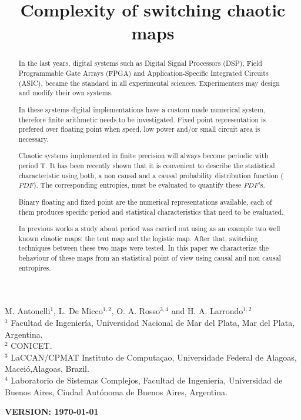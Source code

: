 \begin{frontmatter}

	\title{Complexity of switching chaotic maps}
	M. Antonelli$^{1}$, L. De Micco$^{1,2}$, O. A. Rosso$^{3,4}$ and H. A. Larrondo$^{1,2}$\\
	$^{1}$ Facultad de Ingenier\'ia, Universidad Nacional de Mar del Plata, Mar del Plata, Argentina.\\
	$^{2}$ CONICET.\\
	$^{3}$ LaCCAN/CPMAT Instituto de Computa\c{c}ao, Universidade Federal de Alagoas, Macei\'o,Alagoas, Brazil.\\
	$^{4}$ Laboratorio de Sistemas Complejos, Facultad de
	Ingenier\'ia, Universidad de Buenos Aires, Ciudad Aut\'onoma de
	Buenos Aires, Argentina.\\

\begin{abstract}
In the last years, digital systems such as Digital Signal Processors (DSP), Field Programmable Gate Arrays (FPGA) and Application-Specific Integrated Circuits (ASIC), became the standard in all experimental sciences.
Experimenters may design and modify their own systems.

In these systems digital implementations have a custom made numerical system, therefore finite arithmetic needs to be investigated.
Fixed point representation is prefered over floating point when  speed, low power and/or small circuit area is necessary.

Chaotic systems implemented in finite precision will always become periodic with period T.
It has been recently shown that it is convenient to describe the statistical characteristic using both, a non causal and a causal probability distribution function ($PDF$).
The corresponding entropies, must be evaluated to quantify these $PDF$'s.  

Binary floating and fixed point are the numerical representations available, each of them produces specific period and statistical characteristics that need to be evaluated.

In previous works a study about period was carried out using as an example two well known chaotic maps: the tent map and the logistic map. After that, switching techniques between these two maps were tested.
In this paper we characterize the behaviour of these maps from an statistical point of view using causal and non causal entropires.

\end{abstract}
\maketitle
\end{frontmatter}
{\bf VERSION: \today}